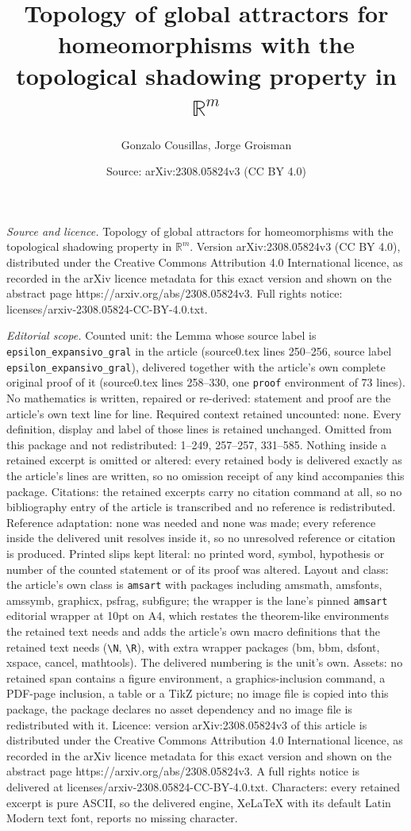 \documentclass[10pt,a4paper]{amsart}
\title[Topology of global attractors for homeomorphisms with the to]{Topology of global attractors for homeomorphisms with the topological shadowing property in $\mathbb{R}^m$}
\author{Gonzalo Cousillas, Jorge Groisman}
\date{Source: arXiv:2308.05824v3 (CC BY 4.0)}
\begin{document}
\maketitle

\noindent\emph{Source and licence.} Topology of global attractors for homeomorphisms with the topological shadowing property in $\mathbb{R}^m$. Version arXiv:2308.05824v3 (CC BY 4.0), distributed under the Creative Commons Attribution 4.0 International licence, as recorded in the arXiv licence metadata for this exact version and shown on the abstract page https://arxiv.org/abs/2308.05824v3. Full rights notice: licenses/arxiv-2308.05824-CC-BY-4.0.txt.\par\smallskip

\noindent\textit{Editorial scope.} Counted unit: the Lemma whose source label is \texttt{epsilon\_expansivo\_gral} in the article (source0.tex lines 250--256, source label \texttt{epsilon\_expansivo\_gral}), delivered together with the article's own complete original proof of it (source0.tex lines 258--330, one \texttt{proof} environment of 73 lines). No mathematics is written, repaired or re-derived: statement and proof are the article's own text line for line. Required context retained uncounted: none. Every definition, display and label of those lines is retained unchanged. Omitted from this package and not redistributed: 1--249, 257--257, 331--585. Nothing inside a retained excerpt is omitted or altered: every retained body is delivered exactly as the article's lines are written, so no omission receipt of any kind accompanies this package. Citations: the retained excerpts carry no citation command at all, so no bibliography entry of the article is transcribed and no reference is redistributed. Reference adaptation: none was needed and none was made; every reference inside the delivered unit resolves inside it, so no unresolved reference or citation is produced. Printed slips kept literal: no printed word, symbol, hypothesis or number of the counted statement or of its proof was altered. Layout and class: the article's own class is \texttt{amsart} with packages including amsmath, amsfonts, amssymb, graphicx, psfrag, subfigure; the wrapper is the lane's pinned \texttt{amsart} editorial wrapper at 10pt on A4, which restates the theorem-like environments the retained text needs and adds the article's own macro definitions that the retained text needs (\texttt{\textbackslash N}, \texttt{\textbackslash R}), with extra wrapper packages (bm, bbm, dsfont, xspace, cancel, mathtools). The delivered numbering is the unit's own. Assets: no retained span contains a figure environment, a graphics-inclusion command, a PDF-page inclusion, a table or a TikZ picture; no image file is copied into this package, the package declares no asset dependency and no image file is redistributed with it. Licence: version arXiv:2308.05824v3 of this article is distributed under the Creative Commons Attribution 4.0 International licence, as recorded in the arXiv licence metadata for this exact version and shown on the abstract page https://arxiv.org/abs/2308.05824v3. A full rights notice is delivered at licenses/arxiv-2308.05824-CC-BY-4.0.txt. Characters: every retained excerpt is pure ASCII, so the delivered engine, XeLaTeX with its default Latin Modern text font, reports no missing character.
\end{document}

